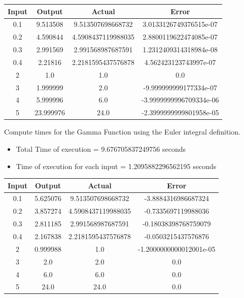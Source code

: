\documentclass[12pt]{article}
\begin{document}
\begin{table}[H]
	\centering
	\begin{tabular}{ | c c c c | }
		\hline
		\hline
		Input & Output & Actual & Error\\
		\hline
		\hline
		0.1 & 9.513508 & 9.513507698668732 & 3.0133126749376515e-07\\
		\hline
		0.2 & 4.590844 & 4.5908437119988035 & 2.8800119622474085e-07\\
		\hline
		0.3 & 2.991569 & 2.991568987687591 & 1.2312409314318984e-08\\
		\hline
		0.4 & 2.21816 & 2.2181595437576878 & 4.562423123743997e-07\\
		\hline
		2 & 1.0 & 1.0 & 0.0\\
		\hline
		3 & 1.999999 & 2.0 & -9.999999999177334e-07\\
		\hline
		4 & 5.999996 & 6.0 & -3.9999999996709334e-06\\
		\hline
		5 & 23.999976 & 24.0 & -2.3999999999801958e-05\\
		\hline
		\hline
	\end{tabular}
\end{table}

\begin{bf}
	\flushleft
	Compute times for the Gamma Function using the Euler integral definition.
\end{bf}

\begin{itemize}
	\item Total Time of execution = 9.676705837249756 seconds
	\item Time of execution for each input = 1.2095882296562195 seconds
\end{itemize}

\begin{table}[H]
	\centering
	\begin{tabular}{ | c c c c | }
		\hline
		\hline
		Input & Output & Actual & Error\\
		\hline
		\hline
		0.1 & 5.625076 & 9.513507698668732 & -3.8884316986687324\\
		\hline
		0.2 & 3.857274 & 4.5908437119988035 & -0.7335697119988036\\
		\hline
		0.3 & 2.811185 & 2.991568987687591 & -0.18038398768759079\\
		\hline
		0.4 & 2.167838 & 2.2181595437576878 & -0.0503215437576876\\
		\hline
		2 & 0.999988 & 1.0 & -1.2000000000012001e-05\\
		\hline
		3 & 2.0 & 2.0 & 0.0\\
		\hline
		4 & 6.0 & 6.0 & 0.0\\
		\hline
		5 & 24.0 & 24.0 & 0.0\\
		\hline
		\hline
	\end{tabular}
\end{table}
\end{document}
